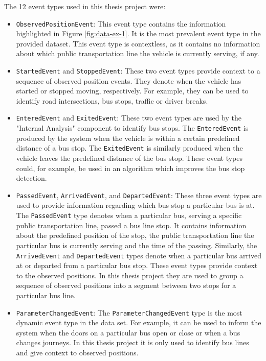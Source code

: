 The 12 event types used in this thesis project were:
\begin{itemize}
    \item \texttt{ObservedPositionEvent}:
    This event type contains the information highlighted in Figure \ref{fig:data-ex-1}.
    It is the most prevalent event type in the provided dataset.
    This event type is contextless, as it contains no information about which public transportation line the vehicle is currently serving, if any. 
    
    \item \texttt{StartedEvent} and \texttt{StoppedEvent}:
    These two event types provide context to a sequence of observed position events.
    They denote when the vehicle has started or stopped moving, respectively.
    For example, they can be used to identify road intersections, bus stops, traffic or driver breaks.
    
    \item \texttt{EnteredEvent} and \texttt{ExitedEvent}:
    These two event types are used by the "Internal Analysis" component to identify bus stops.
    The \texttt{EnteredEvent} is produced by the system when the vehicle is within a certain predefined distance of a bus stop.
    The \texttt{ExitedEvent} is similarly produced when the vehicle leaves the predefined distance of the bus stop.
    These event types could, for example, be used in an algorithm which improves the bus stop detection.
    
    \item \texttt{PassedEvent}, \texttt{ArrivedEvent}, and \texttt{DepartedEvent}:
    These three event types are used to provide information regarding which bus stop a particular bus is at.
    The \texttt{PassedEvent} type denotes when a particular bus, serving a specific public transportation line, passed a bus line stop.
    It contains information about the predefined position of the stop, the public transportation line the particular bus is currently serving and the time of the passing.
    Similarly, the \texttt{ArrivedEvent} and \texttt{DepartedEvent} types denote when a particular bus arrived at or departed from a particular bus stop.
    These event types provide context to the observed positions.
    In this thesis project they are used to group a sequence of observed positions into a segment between two stops for a particular bus line.
    
    \item \texttt{ParameterChangedEvent}:  
    The \texttt{ParameterChangedEvent} type is the most dynamic event type in the data set.
    For example, it can be used to inform the system when the doors on a particular bus open or close or when a bus changes journeys.
    In this thesis project it is only used to identify bus lines and give context to observed positions.
    

\end{itemize}
